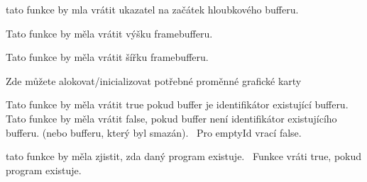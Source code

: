 \begin{DoxyRefList}
\item[\label{todo__todo000032}%
\Hypertarget{todo__todo000032}%
Global \hyperlink{group__framebuffer__tasks_gab755d51ff9686df1fb9b2892b9861c1d}{G\+PU\+:\+:get\+Framebuffer\+Depth} ()]tato funkce by mla vrátit ukazatel na začátek hloubkového bufferu.~\newline
  
\item[\label{todo__todo000034}%
\Hypertarget{todo__todo000034}%
Global \hyperlink{group__framebuffer__tasks_gaa115f7153407b8020fd153b71abccf0e}{G\+PU\+:\+:get\+Framebuffer\+Height} ()]Tato funkce by měla vrátit výšku framebufferu.  
\item[\label{todo__todo000033}%
\Hypertarget{todo__todo000033}%
Global \hyperlink{group__framebuffer__tasks_ga467b565d440e5742b7ebc104a2d70ce3}{G\+PU\+:\+:get\+Framebuffer\+Width} ()]Tato funkce by měla vrátit šířku framebufferu.  
\item[\label{todo__todo000001}%
\Hypertarget{todo__todo000001}%
Global \hyperlink{group__gpu__init_ga2ca7973e32f63ba3472166a007419a75}{G\+PU\+:\+:G\+PU} ()]Zde můžete alokovat/inicializovat potřebné proměnné grafické karty  
\item[\label{todo__todo000007}%
\Hypertarget{todo__todo000007}%
Global \hyperlink{group__buffer__tasks_gae725a1955d617a7e655ab751c6e05e97}{G\+PU\+:\+:is\+Buffer} (Buffer\+ID buffer)]Tato funkce by měla vrátit true pokud buffer je identifikátor existující bufferu.~\newline
 Tato funkce by měla vrátit false, pokud buffer není identifikátor existujícího bufferu. (nebo bufferu, který byl smazán).~\newline
 Pro empty\+Id vrací false.~\newline
  
\item[\label{todo__todo000022}%
\Hypertarget{todo__todo000022}%
Global \hyperlink{group__program__tasks_ga481c0eb5be3150af401a58fa167506e0}{G\+PU\+:\+:is\+Program} (Program\+ID prg)]tato funkce by měla zjistit, zda daný program existuje.~\newline
 Funkce vráti true, pokud program existuje.~\newline
  

\end{DoxyRefList}
